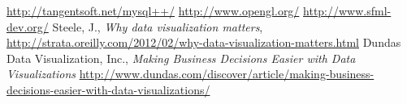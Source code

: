 \documentclass[11pt]{article}
\begin{document}
\begin{thebibliography}{10}
\url{http://tangentsoft.net/mysql++/}
\url{http://www.opengl.org/}
\url{http://www.sfml-dev.org/}
Steele, J., \textit{Why data visualization matters}, 
		\url{http://strata.oreilly.com/2012/02/why-data-visualization-matters.html}
Dundas Data Visualization, Inc., \textit{Making Business Decisions Easier with Data Visualizations}
		\url{http://www.dundas.com/discover/article/making-business-decisions-easier-with-data-visualizations/}
\end{thebibliography}
\end{document}
